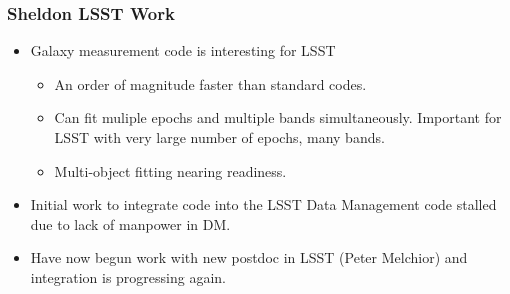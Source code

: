 \documentclass{beamer}
\begin{document}
\frame
{

    \frametitle{Sheldon LSST Work}
    \begin{itemize}
        \item Galaxy measurement code is interesting for LSST
            \begin{itemize}

                \item An order of magnitude faster than standard codes.

                \item Can fit muliple epochs and multiple bands simultaneously.  Important
                    for LSST with very large number of epochs, many bands.

                \item Multi-object fitting nearing readiness.

            \end{itemize}

        \item Initial work to integrate code into the LSST Data Management
            code stalled due to lack of manpower in DM.

        \item Have now begun work with new postdoc in LSST (Peter Melchior) and
            integration is progressing again.

    \end{itemize}
}
\end{document}
